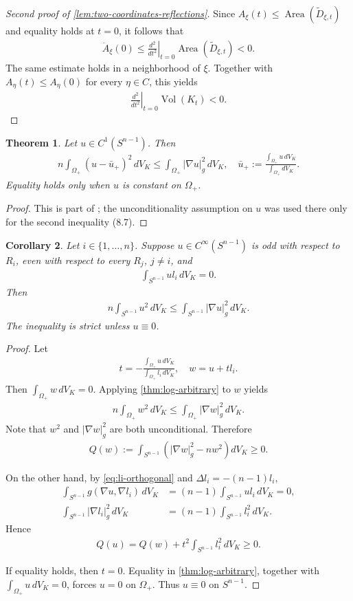 \documentclass[12pt]{amsart}
\newcommand{\Sn}{S^{n-1}}
\newcommand{\eq}[1]{\begin{equation}\begin{alignedat}{2}#1\end{alignedat}\end{equation}}
\theoremstyle{plain}
\newtheorem{theorem}{Theorem}[section]
\newtheorem{corollary}[theorem]{Corollary}
\theoremstyle{definition}
\theoremstyle{remark}
\numberwithin{equation}{section}
\begin{document}
\begin{proof}[Second proof of \autoref{lem:two-coordinates-reflections}]
Since $A_{\xi}(t)\leq \operatorname{Area}(\widetilde{D}_{\xi,t})$ and equality holds at $t=0$, it follows that
\eq{
 \ddot{A}_{\xi}(0)
 \leq
 \left.\frac{d^2}{dt^2}\right|_{t=0}
 \operatorname{Area}(\widetilde{D}_{\xi,t})<0.
}
The same estimate holds in a neighborhood of $\xi$. Together with $A_{\eta}(t)\leq A_{\eta}(0)$ for every $\eta\in C$, this yields
\eq{
 \left.\frac{d^2}{dt^2}\right|_{t=0}\operatorname{Vol}(K_t)<0.
}
\end{proof}

\begin{theorem}\label{thm:log-arbitrary}
Let $u\in C^1(\Sn)$. Then \eq{\label{eq:log-arbitrary}
 n\int_{\Omega_+}(u-\bar{u}_+)^2\,dV_K
 \leq \int_{\Omega_+}|\nabla u|_g^2\,dV_K,
 \quad
\bar{u}_+:=\frac{\int_{\Omega_+}u\,dV_K}
 {\int_{\Omega_+}dV_K}.
}
Equality holds only when $u$ is constant on $\Omega_+$.
\end{theorem}
\begin{proof}
This is part of \cite[Thm. 8.12]{HI26}; the unconditionality assumption on $u$ was used there only for the second inequality (8.7).
\end{proof}


\begin{corollary}\label{cor:one-odd-orthogonal}
Let $i\in\{1,\ldots,n\}$. Suppose $u\in C^{\infty}(\Sn)$ is odd with respect to $R_i$, even with respect to every $R_j$, $j\ne i$, and
\eq{\label{eq:li-orthogonal}
 \int_{\Sn}ul_i\,dV_K=0.
}
Then
\eq{
 n\int_{\Sn}u^2\,dV_K
 \leq\int_{\Sn}|\nabla u|_g^2\,dV_K.
}
The inequality is strict unless $u\equiv 0$.
\end{corollary}

\begin{proof}
Let
\eq{
 t=-\frac{\int_{\Omega_+}u\,dV_K}{\int_{\Omega_+}l_i\,dV_K},\quad w=u+tl_i.
}
Then $\int_{\Omega_+}w\,dV_K=0$. Applying \autoref{thm:log-arbitrary} to $w$ yields
\eq{
 n\int_{\Omega_+}w^2\,dV_K
 \leq\int_{\Omega_+}|\nabla w|_g^2\,dV_K.
}
Note that $w^2$ and $|\nabla w|_g^2$ are both unconditional. Therefore
\eq{
 Q(w):=\int_{\Sn}\left(|\nabla w|_g^2-nw^2\right)dV_K\geq 0.
}

On the other hand, by \eqref{eq:li-orthogonal} and $\Delta l_i=-(n-1)l_i$,
\eq{
 \int_{\Sn}g(\nabla u,\nabla l_i)\,dV_K&=(n-1)\int_{\Sn}ul_i\,dV_K=0,\\
 \int_{\Sn}|\nabla l_i|_g^2\,dV_K&=(n-1)\int_{\Sn}l_i^2\,dV_K.
}
Hence
\eq{
 Q(u)=Q(w)+t^2\int_{\Sn}l_i^2\,dV_K\geq 0.
}

If equality holds, then $t=0$. Equality in \autoref{thm:log-arbitrary}, together with $\int_{\Omega_+}u\,dV_K=0$, forces $u=0$ on $\Omega_+$. Thus $u\equiv 0$ on $\Sn$.
\end{proof}
\end{document}
